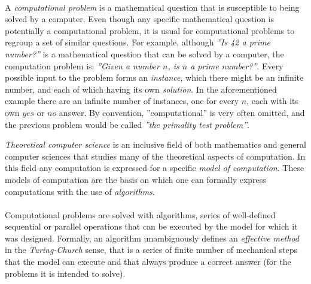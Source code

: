	\paragraph{}
	A \emph{computational problem} is a mathematical question that is susceptible to being solved by a computer.
	Even though any specific mathematical question is potentially a computational problem, it is usual for computational problems to regroup a set of similar questions.
	For example, although \textit{''Is 42 a prime number?''} is a mathematical question that can be solved by a computer, the computation problem is: \textit{''Given a number $n$, is $n$ a prime number?''}.
	Every possible input to the problem forms an \emph{instance}, which there might be an infinite number, and each of which having its own \emph{solution}.
	In the aforementioned example there are an infinite number of instances, one for every $n$, each with its own $yes$ or $no$ answer.
	By convention, ''computational'' is very often omitted, and the previous problem would be called \textit{''the primality test \emph{problem}''}.

	\emph{Theoretical computer science} is an inclusive field of both mathematics and general computer sciences that studies many of the theoretical aspects of computation.
	In this field any computation is expressed for a specific \emph{model of computation}.
	These models of computation are the basis on which one can formally express computations with the use of \emph{algorithms}.

	\paragraph{}
	Computational problems are solved with algorithms, series of well-defined sequential or parallel operations that can be executed by the model for which it was designed.
	Formally, an algorithm unambiguously defines an \emph{effective method} in the \emph{Turing-Church} sense, that is a series of finite number of mechanical steps that the model can execute and that always produce a correct answer (for the problems it is intended to solve).

